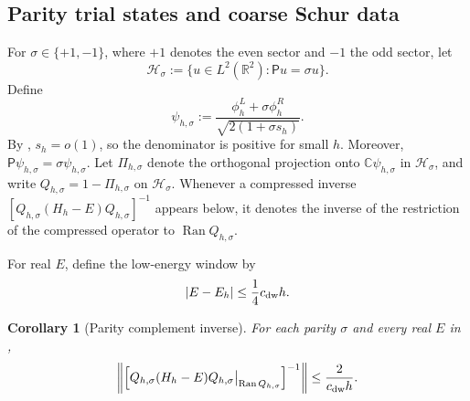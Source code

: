 \documentclass[11pt]{article}
\newtheorem{corollary}[theorem]{Corollary}
\newcommand{\R}{\mathbb R}
\newcommand{\C}{\mathbb C}
\newcommand{\Ran}{\operatorname{Ran}}
\begin{document}
\subsection{Parity trial states and coarse Schur data}\label{sec:parity-trial-data}
For $\sigma\in\{+1,-1\}$, where $+1$ denotes the even sector and $-1$ the odd
sector, let
\begin{equation}\label{eq:parity-space}
 \mathcal H_\sigma:=\{u\in L^2(\R^2):\mathsf Pu=\sigma u\}.
\end{equation}
Define
\begin{equation}\label{eq:psi-sigma}
 \psi_{h,\sigma}
 :=\frac{\phi_h^L+\sigma\phi_h^R}
 {\sqrt{2(1+\sigma s_h)}}.
\end{equation}
By , $s_h=o(1)$, so the denominator is positive for small $h$. Moreover,
$\mathsf P\psi_{h,\sigma}=\sigma\psi_{h,\sigma}$. Let $\Pi_{h,\sigma}$ denote the orthogonal projection onto
$\C\psi_{h,\sigma}$ in $\mathcal H_\sigma$, and write $Q_{h,\sigma}=1-\Pi_{h,\sigma}$ on $\mathcal H_\sigma$.
Whenever a compressed inverse
$[Q_{h,\sigma}(H_h-E)Q_{h,\sigma}]^{-1}$ appears below, it denotes the inverse
of the restriction of the compressed operator to $\Ran Q_{h,\sigma}$.

For real $E$, define the low-energy window by
\begin{equation}\label{eq:low-window}
 |E-E_h|\le\frac14c_{\rm dw}h.
\end{equation}
\begin{corollary}[Parity complement inverse]
For each parity $\sigma$ and every real $E$ in ,
\begin{equation}\label{eq:parity-compressed-inverse}
 \left\|
 \left[
 Q_{h,\sigma}(H_h-E)Q_{h,\sigma}
 \big|_{\Ran Q_{h,\sigma}}
 \right]^{-1}
 \right\|
 \le\frac{2}{c_{\rm dw}h}.
\end{equation}
\end{corollary}
\end{document}
